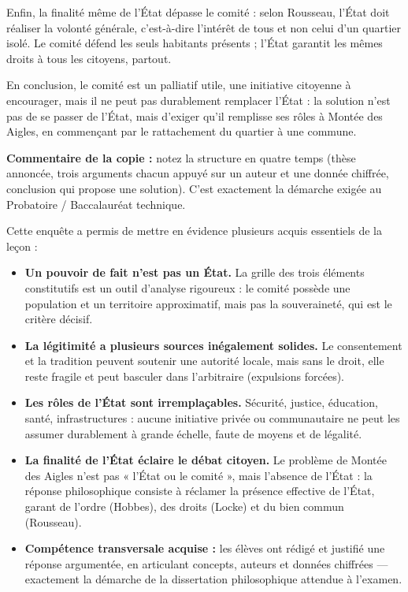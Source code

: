 \documentclass[11pt]{article}
\newcounter{popsec}
\newcounter{popsub}
\newcommand{\courssub}[1]{%
  \stepcounter{popsub}%
  \par\vspace{9pt}\noindent{\popxbold\fontsize{11.5}{13}\selectfont\color{popink}{\color{poporange}\thepopsec.\thepopsub}\hspace{6pt}#1}\par\nopagebreak\vspace{4pt}
}
\begin{document}
\begin{exoresolu}
Enfin, la finalité même de l'État dépasse le comité : selon Rousseau, l'État doit réaliser la volonté générale, c'est-à-dire l'intérêt de tous et non celui d'un quartier isolé. Le comité défend les seuls habitants présents ; l'État garantit les mêmes droits à tous les citoyens, partout.

En conclusion, le comité est un palliatif utile, une initiative citoyenne à encourager, mais il ne peut pas durablement remplacer l'État : la solution n'est pas de se passer de l'État, mais d'exiger qu'il remplisse ses rôles à Montée des Aigles, en commençant par le rattachement du quartier à une commune.

\textbf{Commentaire de la copie :} notez la structure en quatre temps (thèse annoncée, trois arguments chacun appuyé sur un auteur et une donnée chiffrée, conclusion qui propose une solution). C'est exactement la démarche exigée au Probatoire / Baccalauréat technique.
\end{exoresolu}

\courssub{Bilan de l'activité}

Cette enquête a permis de mettre en évidence plusieurs acquis essentiels de la leçon :
\begin{itemize}
\item \textbf{Un pouvoir de fait n'est pas un État.} La grille des trois éléments constitutifs est un outil d'analyse rigoureux : le comité possède une population et un territoire approximatif, mais pas la souveraineté, qui est le critère décisif.
\item \textbf{La légitimité a plusieurs sources inégalement solides.} Le consentement et la tradition peuvent soutenir une autorité locale, mais sans le droit, elle reste fragile et peut basculer dans l'arbitraire (expulsions forcées).
\item \textbf{Les rôles de l'État sont irremplaçables.} Sécurité, justice, éducation, santé, infrastructures : aucune initiative privée ou communautaire ne peut les assumer durablement à grande échelle, faute de moyens et de légalité.
\item \textbf{La finalité de l'État éclaire le débat citoyen.} Le problème de Montée des Aigles n'est pas « l'État ou le comité », mais l'absence de l'État : la réponse philosophique consiste à réclamer la présence effective de l'État, garant de l'ordre (Hobbes), des droits (Locke) et du bien commun (Rousseau).
\item \textbf{Compétence transversale acquise :} les élèves ont rédigé et justifié une réponse argumentée, en articulant concepts, auteurs et données chiffrées — exactement la démarche de la dissertation philosophique attendue à l'examen.
\end{itemize}
\end{document}
